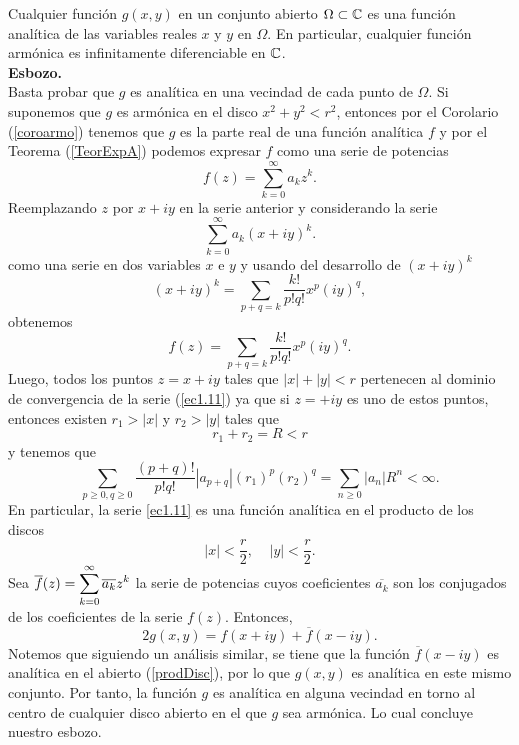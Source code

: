\begin{teor}\label{teorserpot1}
	Cualquier función $g(x,y)$ en un conjunto abierto $\Omega\subset\mathbb{C}$ es una función analítica de las variables reales $x$ y $y$ en $\Omega$. En particular, cualquier función armónica es infinitamente diferenciable en $\mathbb{C}$.\\
	\textbf{Esbozo.}\\
	Basta probar que $g$ es analítica en una vecindad de cada punto de $\Omega$. Si suponemos que $g$ es armónica en el disco $x^2+y^2<r^2$, entonces por el Corolario (\ref{coroarmo}) tenemos que $g$ es la parte real de una función analítica $f$ y por el Teorema (\ref{TeorExpA}) podemos expresar $f$ como una serie de potencias
	\begin{equation}\label{ec1.10}
		f(z)=\sum_{k=0}^{\infty}a_kz^{k}.
	\end{equation}
	Reemplazando $z$ por $x+iy$ en la serie anterior y considerando la serie
	\begin{equation}\label{ec1.11}
		\sum_{k=0}^{\infty}a_k(x+iy)^{k}.
	\end{equation}
	como una serie en dos  variables $x$ e $y$ y usando del desarrollo de $(x+iy)^k$
	$$(x+iy)^k=\sum_{p+q=k}\dfrac{k!}{p!q!}x^{p}(iy)^q,$$
	obtenemos 
	$$f(z)=\sum_{p+q=k}\dfrac{k!}{p!q!}x^{p}(iy)^q.$$
	Luego, todos los puntos $z=x+iy$ tales que $|x|+|y|<r$ pertenecen al dominio de convergencia de la serie (\ref{ec1.11}) ya que si $z=+iy$ es uno de estos puntos, entonces existen $r_1>|x|$ y $r_2>|y|$ tales que 
	$$r_1+r_2=R<r$$
	y tenemos que 
	$$\sum_{p\geq0, q\geq0}\dfrac{(p+q)!}{p!q!}|a_{p+q}|(r_1)^p(r_2)^q=\sum_{n\geq0}|a_n|R^n<\infty.$$
	En particular, la serie \ref{ec1.11} es una función analítica en el producto de los discos 
	\begin{equation}\label{prodDisc}
		|x|<\dfrac{r}{2},\;\;\;\;|y|<\dfrac{r}{2}.
	\end{equation}
	Sea $\overline{f}(z)=\displaystyle\sum_{k=0}^{\infty}\overline{a_{k}}z^k$ la serie de potencias cuyos coeficientes $\overline{a_k}$ son los conjugados de los coeficientes de la serie $f(z)$. Entonces, 
	\begin{equation}\label{ec2g(x,y)}
		2g(x,y)=f(x+iy)+\overline{f}(x-iy).
	\end{equation}
	Notemos que siguiendo un análisis similar, se tiene que la función $\overline{f}(x-iy)$ es analítica en el abierto (\ref{prodDisc}), por lo que $g(x,y)$ es analítica en este mismo conjunto. Por tanto, la función $g$ es analítica en alguna vecindad en torno al centro de cualquier disco abierto en el que $g$ sea armónica. Lo cual concluye nuestro esbozo.\endproof
\end{teor}
